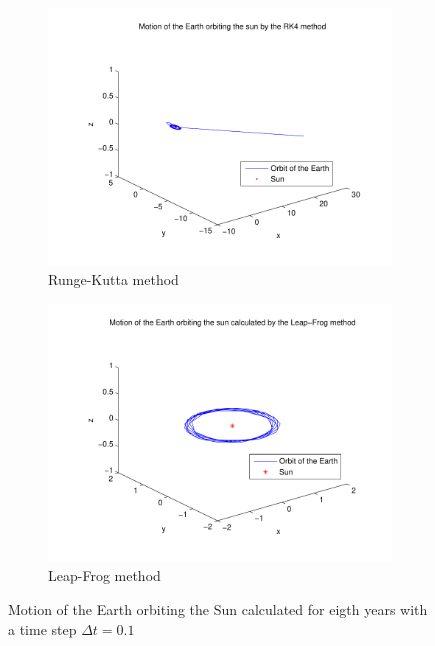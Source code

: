 \documentclass[a4paper,12pt, english]{article}
\begin{document}
        
\begin{figure}[H]
        \centering
        \begin{subfigure}[b]{0.6\textwidth}
                \includegraphics[width=\textwidth]{RK4_n_80_t_8.pdf}
                \caption{Runge-Kutta method}
                \label{fig:RK4_dt_0.1}
        \end{subfigure}%
        
        \begin{subfigure}[b]{0.6\textwidth}
                \includegraphics[width=\textwidth]{LF_n_80_t_8.pdf}
                \caption{Leap-Frog method}
                \label{fig:LF_dt_0.1}
        \end{subfigure}
        \caption{Motion of the Earth orbiting the Sun calculated for eigth years with a time step $\Delta t = 0.1$}
\label{dt0.1}
\end{figure}
\end{document}
